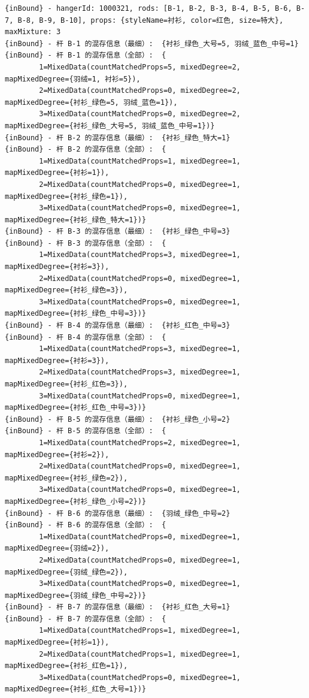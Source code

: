 {\begin{verbatim}
{inBound} - hangerId: 1000321, rods: [B-1, B-2, B-3, B-4, B-5, B-6, B-7, B-8, B-9, B-10], props: {styleName=衬衫, color=红色, size=特大}, maxMixture: 3
{inBound} - 杆 B-1 的混存信息（最细）:  {衬衫_绿色_大号=5, 羽绒_蓝色_中号=1}
{inBound} - 杆 B-1 的混存信息（全部）:  {
		1=MixedData(countMatchedProps=5, mixedDegree=2, mapMixedDegree={羽绒=1, 衬衫=5}), 
		2=MixedData(countMatchedProps=0, mixedDegree=2, mapMixedDegree={衬衫_绿色=5, 羽绒_蓝色=1}), 
		3=MixedData(countMatchedProps=0, mixedDegree=2, mapMixedDegree={衬衫_绿色_大号=5, 羽绒_蓝色_中号=1})}
{inBound} - 杆 B-2 的混存信息（最细）:  {衬衫_绿色_特大=1}
{inBound} - 杆 B-2 的混存信息（全部）:  {
		1=MixedData(countMatchedProps=1, mixedDegree=1, mapMixedDegree={衬衫=1}), 
		2=MixedData(countMatchedProps=0, mixedDegree=1, mapMixedDegree={衬衫_绿色=1}), 
		3=MixedData(countMatchedProps=0, mixedDegree=1, mapMixedDegree={衬衫_绿色_特大=1})}
{inBound} - 杆 B-3 的混存信息（最细）:  {衬衫_绿色_中号=3}
{inBound} - 杆 B-3 的混存信息（全部）:  {
		1=MixedData(countMatchedProps=3, mixedDegree=1, mapMixedDegree={衬衫=3}), 
		2=MixedData(countMatchedProps=0, mixedDegree=1, mapMixedDegree={衬衫_绿色=3}), 
		3=MixedData(countMatchedProps=0, mixedDegree=1, mapMixedDegree={衬衫_绿色_中号=3})}
{inBound} - 杆 B-4 的混存信息（最细）:  {衬衫_红色_中号=3}
{inBound} - 杆 B-4 的混存信息（全部）:  {
		1=MixedData(countMatchedProps=3, mixedDegree=1, mapMixedDegree={衬衫=3}), 
		2=MixedData(countMatchedProps=3, mixedDegree=1, mapMixedDegree={衬衫_红色=3}), 
		3=MixedData(countMatchedProps=0, mixedDegree=1, mapMixedDegree={衬衫_红色_中号=3})}
{inBound} - 杆 B-5 的混存信息（最细）:  {衬衫_绿色_小号=2}
{inBound} - 杆 B-5 的混存信息（全部）:  {
		1=MixedData(countMatchedProps=2, mixedDegree=1, mapMixedDegree={衬衫=2}), 
		2=MixedData(countMatchedProps=0, mixedDegree=1, mapMixedDegree={衬衫_绿色=2}), 
		3=MixedData(countMatchedProps=0, mixedDegree=1, mapMixedDegree={衬衫_绿色_小号=2})}
{inBound} - 杆 B-6 的混存信息（最细）:  {羽绒_绿色_中号=2}
{inBound} - 杆 B-6 的混存信息（全部）:  {
		1=MixedData(countMatchedProps=0, mixedDegree=1, mapMixedDegree={羽绒=2}), 
		2=MixedData(countMatchedProps=0, mixedDegree=1, mapMixedDegree={羽绒_绿色=2}), 
		3=MixedData(countMatchedProps=0, mixedDegree=1, mapMixedDegree={羽绒_绿色_中号=2})}
{inBound} - 杆 B-7 的混存信息（最细）:  {衬衫_红色_大号=1}
{inBound} - 杆 B-7 的混存信息（全部）:  {
		1=MixedData(countMatchedProps=1, mixedDegree=1, mapMixedDegree={衬衫=1}), 
		2=MixedData(countMatchedProps=1, mixedDegree=1, mapMixedDegree={衬衫_红色=1}), 
		3=MixedData(countMatchedProps=0, mixedDegree=1, mapMixedDegree={衬衫_红色_大号=1})}

\end{verbatim}}
